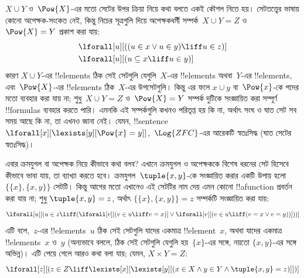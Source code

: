 \documentclass[../../../include/open-logic-section]{subfiles}
\begin{document}
$X \cup Y$ ও~$\Pow{X}$-এর মতো সেটের উপর ক্রিয়া নিয়ে কথা বলতে একই
কৌশল নিতে হয়। সেটতত্ত্বের ভাষায় কোনো অপেক্ষক-সংকেত নেই, কিন্তু নিচের
সূত্রগুলি দিয়ে অপেক্ষকধর্মী সম্পর্ক~$X \cup Y = Z$ ও~$\Pow{X} = Y$
প্রকাশ করা যায়:
\begin{align*}
& \lforall[u][((u \in x \lor u \in y) \liff u \in z)]\\
& \lforall[u][(u \subseteq x \liff u \in y )]
\end{align*}
কারণ $X \cup Y$-এর !!{element}s ঠিক সেই সেটগুলি যেগুলি~$X$-এর
!!{element}s অথবা~$Y$-এর !!{element}s, এবং~$\Pow{X}$-এর
!!{element}s ঠিক~$X$-এর উপসেটগুলি।
কিন্তু এর ফলে $x \cup y$ বা~$\Pow{x}$-কে পদের মতো ব্যবহার করা যায় না;
শুধু~$X \cup Y = Z$ ও~$\Pow{X} = Y$ সম্পর্ক দুটিকে সংজ্ঞায়িত করা
সম্পূর্ণ !!{formula}s ব্যবহার করতে পারি। এমনকি এই সম্পর্কগুলি কখনও
পরিতৃপ্ত হয় কি না, অর্থাৎ সংঘ ও ঘাত সেট সব সময় আছে কি না, তা এখনও
জানা নেই। যেমন, !!{sentence}
$\lforall[x][\lexists[y][\Pow{x} = y]]$,~$\Log{ZFC}$-এর আরেকটি
স্বতঃসিদ্ধ (ঘাত সেটের স্বতঃসিদ্ধ)।

এবার ক্রমযুগল বা অপেক্ষক নিয়ে কীভাবে কথা বলব? এখানে ক্রমযুগল ও
অপেক্ষককে বিশেষ ধরনের সেট হিসেবে কীভাবে ভাবা যায়, তা ব্যাখ্যা করতে
হবে। ক্রমযুগল~$\tuple{x,y}$-কে সংজ্ঞায়িত করার একটি উপায় হলো
$\{\{x\},\{x,y\}\}$ সেটটি। কিন্তু আগের মতো এখানেও এই সেটটির নাম দেয়
এমন কোনো !!a{function} প্রবর্তন করা যায় না; শুধু
$\tuple{x,y}=z$, অর্থাৎ $\{\{x\},\{x,y\}\}=z$ সম্পর্কটি সংজ্ঞায়িত
করা যায়:
\[
\lforall[u][(u \in z \liff (\lforall[v][(v \in u \liff v = x)] \lor
  \lforall[v][(v \in u \liff (v = x \lor v = y))]))]
\]
এটি বলে,~$z$-এর !!{element}s~$u$ ঠিক সেই সেটগুলি যাদের একমাত্র
!!{element}~$x$, অথবা যাদের একমাত্র !!{element}s~$x$ ও~$y$ (অন্যভাবে
বললে, ঠিক সেই সেটগুলি যেগুলি হয়~$\{x\}$-এর সঙ্গে, নয়তো
$\{x,y\}$-এর সঙ্গে অভিন্ন)। এটি পেয়ে গেলে আরও কথা বলা যায়; যেমন,
$X \times Y = Z$:
\[
\lforall[z][(z \in Z \liff \lexists[x][\lexists[y][(x \in
        X \land y \in Y \land \tuple{x, y} = z)]])]
\]
\end{document}

